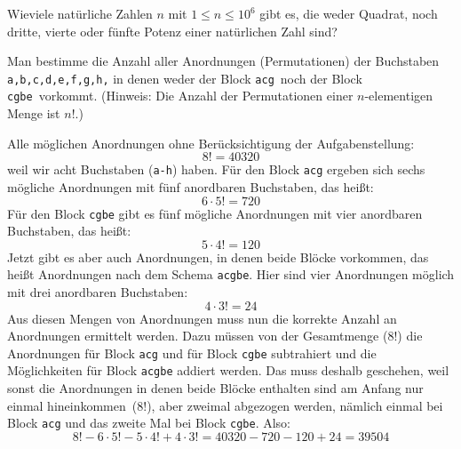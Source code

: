 \documentclass[a4paper, 12pt, margins=2.5cm]{homework}
\begin{document}
  \begin{problem}
    Wieviele natürliche Zahlen $n$ mit $1\leq n \leq 10^6$ gibt es, die weder
    Quadrat, noch dritte, vierte oder fünfte Potenz einer natürlichen Zahl sind?
  \end{problem}
  \begin{solution}
    
  \end{solution}


  \begin{problem}
    Man bestimme die Anzahl aller Anordnungen (Permutationen) der Buchstaben 
    \texttt{a,b,c,d,e,f,g,h,} in denen weder der Block \glqq \texttt{acg}\grqq\ 
    noch der Block \glqq \texttt{cgbe}\grqq\ vorkommt. (Hinweis: Die Anzahl der
    Permutationen einer $n$-elementigen Menge ist $n!$.)
  \end{problem}
  \begin{solution}
    Alle möglichen Anordnungen ohne Berücksichtigung der Aufgabenstellung:
    \[ 8! = 40320 \]
    weil wir acht Buchstaben (\texttt{a-h}) haben. Für den Block \texttt{acg}
    ergeben sich sechs mögliche Anordnungen mit fünf anordbaren Buchstaben, das heißt:
    \[ 6\cdot 5! = 720 \]
    Für den Block \texttt{cgbe} gibt es fünf mögliche Anordnungen mit vier 
    anordbaren Buchstaben, das heißt:
    \[ 5\cdot 4! = 120 \]
    Jetzt gibt es aber auch Anordnungen, in denen beide Blöcke vorkommen, das
    heißt Anordnungen nach dem Schema \texttt{acgbe}. Hier sind vier Anordnungen
    möglich mit drei anordbaren Buchstaben:
    \[ 4\cdot 3! = 24 \]
    Aus diesen Mengen von Anordnungen muss nun die korrekte Anzahl an Anordnungen
    ermittelt werden. Dazu müssen von der Gesamtmenge ($8!$) die Anordnungen für
    Block \texttt{acg} und für Block \texttt{cgbe} subtrahiert und die 
    Möglichkeiten für Block \texttt{acgbe} addiert werden. Das muss deshalb
    geschehen, weil sonst die Anordnungen in denen beide Blöcke enthalten sind
    am Anfang nur einmal \glqq hineinkommen\grqq\ ($8!$), aber zweimal abgezogen
    werden, nämlich einmal bei Block \texttt{acg} und das zweite Mal bei Block
    \texttt{cgbe}. Also:
    \[ 8! - 6\cdot 5! - 5\cdot 4! + 4\cdot 3! = 40320 - 720 - 120 + 24 = 39504 \]
  \end{solution}
\end{document}
